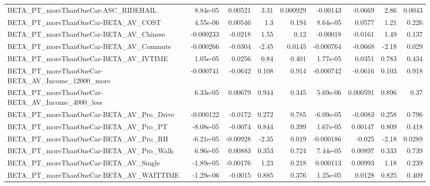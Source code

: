 \begin{tabular}{lrrrrrrrr}
BETA\_PT\_moreThanOneCar-ASC\_RIDEHAIL                &    8.84e-05 &      0.00521 &      3.31 & 0.000929 &   -0.00143 &     -0.0669 &         2.86 &        0.0043 \\
BETA\_PT\_moreThanOneCar-BETA\_AV\_COST                &    4.55e-06 &      0.00546 &       1.3 &    0.194 &   8.64e-05 &      0.0577 &         1.21 &         0.226 \\
BETA\_PT\_moreThanOneCar-BETA\_AV\_Chinese             &   -0.000233 &      -0.0218 &      1.55 &     0.12 &   -0.00018 &     -0.0161 &         1.49 &         0.137 \\
BETA\_PT\_moreThanOneCar-BETA\_AV\_Commute             &   -0.000266 &      -0.0304 &     -2.45 &   0.0145 &  -0.000764 &     -0.0668 &        -2.18 &         0.029 \\
BETA\_PT\_moreThanOneCar-BETA\_AV\_IVTIME              &    1.05e-05 &       0.0256 &      0.84 &    0.401 &   1.77e-05 &      0.0351 &        0.783 &         0.434 \\
BETA\_PT\_moreThanOneCar-BETA\_AV\_Income\_12000\_more   &   -0.000741 &      -0.0642 &     0.108 &    0.914 &  -0.000742 &     -0.0616 &        0.103 &         0.918 \\
BETA\_PT\_moreThanOneCar-BETA\_AV\_Income\_4000\_less    &    6.33e-05 &      0.00679 &     0.944 &    0.345 &   5.69e-06 &    0.000591 &        0.896 &          0.37 \\
BETA\_PT\_moreThanOneCar-BETA\_AV\_Pro\_Drive           &   -0.000122 &      -0.0172 &     0.272 &    0.785 &  -6.09e-05 &     -0.0083 &        0.258 &         0.796 \\
BETA\_PT\_moreThanOneCar-BETA\_AV\_Pro\_PT              &   -8.08e-05 &      -0.0074 &     0.844 &    0.399 &   1.67e-05 &     0.00147 &        0.809 &         0.418 \\
BETA\_PT\_moreThanOneCar-BETA\_AV\_Pro\_RH              &   -6.21e-05 &     -0.00928 &     -2.35 &    0.019 &  -0.000186 &      -0.025 &        -2.18 &        0.0289 \\
BETA\_PT\_moreThanOneCar-BETA\_AV\_Pro\_Walk            &    6.96e-05 &      0.00883 &     0.353 &    0.724 &   7.44e-05 &     0.00897 &        0.333 &         0.739 \\
BETA\_PT\_moreThanOneCar-BETA\_AV\_Single              &   -1.89e-05 &     -0.00176 &      1.23 &    0.218 &   0.000113 &     0.00993 &         1.18 &         0.239 \\
BETA\_PT\_moreThanOneCar-BETA\_AV\_WAITTIME            &   -1.29e-06 &      -0.0015 &     0.885 &    0.376 &   1.25e-05 &      0.0128 &        0.825 &         0.409 \\

\end{tabular}
